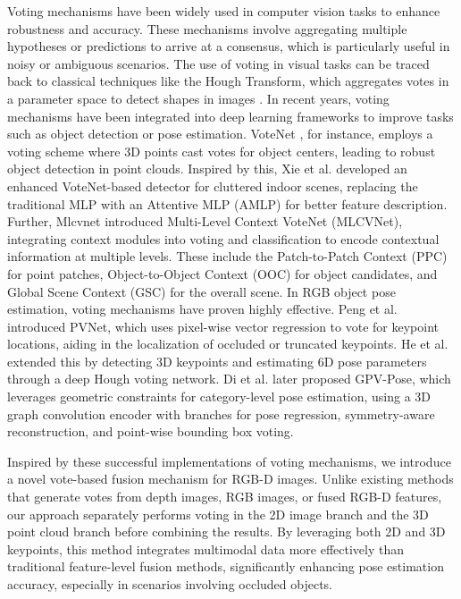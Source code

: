 Voting mechanisms have been widely used in computer vision tasks to enhance robustness and accuracy. These mechanisms involve aggregating multiple hypotheses or predictions to arrive at a consensus, which is particularly useful in noisy or ambiguous scenarios. The use of voting in visual tasks can be traced back to classical techniques like the Hough Transform, which aggregates votes in a parameter space to detect shapes in images \cite{hough1959machine}. In recent years, voting mechanisms have been integrated into deep learning frameworks to improve tasks such as object detection or pose estimation. VoteNet \cite{qi2019deep}, for instance, employs a voting scheme where 3D points cast votes for object centers, leading to robust object detection in point clouds. Inspired by this, Xie et al. \cite{xie2021venet} developed an enhanced VoteNet-based detector for cluttered indoor scenes, replacing the traditional MLP with an Attentive MLP (AMLP) for better feature description. Further, Mlcvnet \cite{xie2020mlcvnet} introduced Multi-Level Context VoteNet (MLCVNet), integrating context modules into voting and classification to encode contextual information at multiple levels. These include the Patch-to-Patch Context (PPC) for point patches, Object-to-Object Context (OOC) for object candidates, and Global Scene Context (GSC) for the overall scene. In RGB object pose estimation, voting mechanisms have proven highly effective. Peng et al. \cite{peng2019pvnet} introduced PVNet, which uses pixel-wise vector regression to vote for keypoint locations, aiding in the localization of occluded or truncated keypoints. He et al. \cite{he2020pvn3d} extended this by detecting 3D keypoints and estimating 6D pose parameters through a deep Hough voting network. Di et al. \cite{di2022gpv} later proposed GPV-Pose, which leverages geometric constraints for category-level pose estimation, using a 3D graph convolution encoder with branches for pose regression, symmetry-aware reconstruction, and point-wise bounding box voting.

Inspired by these successful implementations of voting mechanisms, we introduce a novel vote-based fusion mechanism for RGB-D images. Unlike existing methods that generate votes from depth images, RGB images, or fused RGB-D features, our approach separately performs voting in the 2D image branch and the 3D point cloud branch before combining the results. By leveraging both 2D and 3D keypoints, this method integrates multimodal data more effectively than traditional feature-level fusion methods, significantly enhancing pose estimation accuracy, especially in scenarios involving occluded objects.
